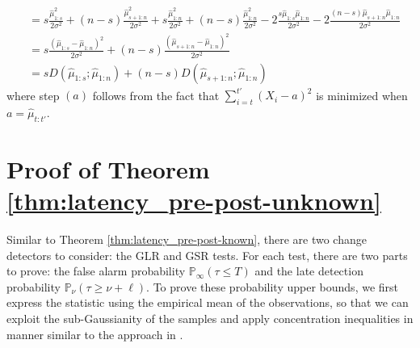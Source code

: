 \documentclass[12pt]{interact}
\newcommand{\lp}{\left(}
\newcommand{\rp}{\right)}
\renewcommand{\Pr}{\mathbb{P}}
\theoremstyle{plain}
\begin{document}
\begin{align}
    &=s\frac{\hat{\mu}_{1:s}^{2}}{2\sigma^{2}}+\lp n-s\rp\frac{\hat{\mu}_{s+1:n}^{2}}{2\sigma^{2}}+s\frac{\hat{\mu}_{1:n}^{2}}{2\sigma^{2}}+\lp n-s\rp\frac{\hat{\mu}_{1:n}^{2}}{2\sigma^{2}}-2\frac{s\hat{\mu}_{1:s}\hat{\mu}_{1:n}}{2\sigma^{2}}-2\frac{\lp n-s\rp\hat{\mu}_{s+1:n}\hat{\mu}_{1:n}}{2\sigma^{2}}\nonumber\\
    &=s\frac{\lp\hat{\mu}_{1:s}-\hat{\mu}_{1:n}\rp^{2}}{2\sigma^{2}}+\lp n-s\rp\frac{\lp\hat{\mu}_{s+1:n}-\hat{\mu}_{1:n}\rp^{2}}{2\sigma^{2}}\nonumber\\
    &=s D \lp\hat{\mu}_{1:s};\hat{\mu}_{1:n}\rp+\lp n-s\rp D \lp\hat{\mu}_{s+1:n};\hat{\mu}_{1:n}\rp\label{eq:lem1_proof}
\end{align}
%
where step $(a)$ follows from the fact that $\sum_{i=t}^{t'}\lp X_{i}-a\rp^{2}$ is minimized when $a=\hat{\mu}_{t:t'}$.

\section{Proof of Theorem \ref{thm:latency_pre-post-unknown}} \label{sec:thm3}

Similar to Theorem \ref{thm:latency_pre-post-known}, there are two change detectors to consider: the GLR and GSR tests. For each test, there are two parts to prove: the false alarm probability $\Pr_{\infty} \lp \tau \leq T \rp$ and the late detection probability $\Pr_{\nu} \lp \tau \geq \nu + \ell \rp$. To prove these probability upper bounds, we first express the statistic using the empirical mean of the observations, so that we can exploit the sub-Gaussianity of the samples and apply concentration inequalities in manner similar to the approach in \citep{besson2022efficient, kaufmann2021mixture}.
\end{document}
